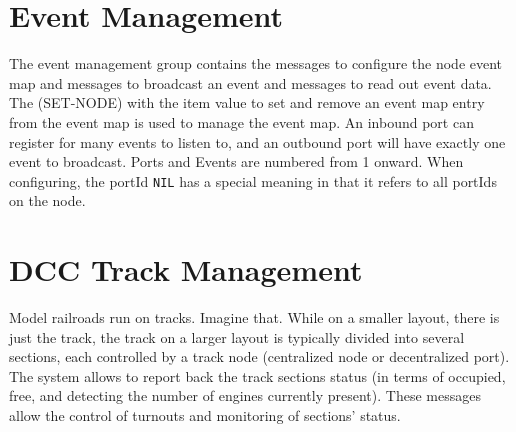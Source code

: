 \section{Event Management}

The event management group contains the messages to configure the node event map and messages to broadcast an event and messages to read out event data. The (SET-NODE) with the item value to set and remove an event map entry from the event map is used to manage the event map. An inbound port can register for many events to listen to, and an outbound port will have exactly one event to broadcast. Ports and Events are numbered from 1 onward. When configuring, the portId \texttt{NIL} has a special meaning in that it refers to all portIds on the node.

\begin{table}[ht!]
    \centering 
    \caption{Event Management}
\end{table}

\section{DCC Track Management}

Model railroads run on tracks. Imagine that. While on a smaller layout, there is just the track, the track on a larger layout is typically divided into several sections, each controlled by a track node \textnormal{(centralized node or decentralized port)}. The system allows to report back the track sections status \textnormal{(in terms of occupied, free, and detecting the number of engines currently present)}. These messages allow the control of turnouts and monitoring of sections' status.

\begin{table}[ht!]
    \centering 
    \caption{DCC Track Management}
\end{table}

